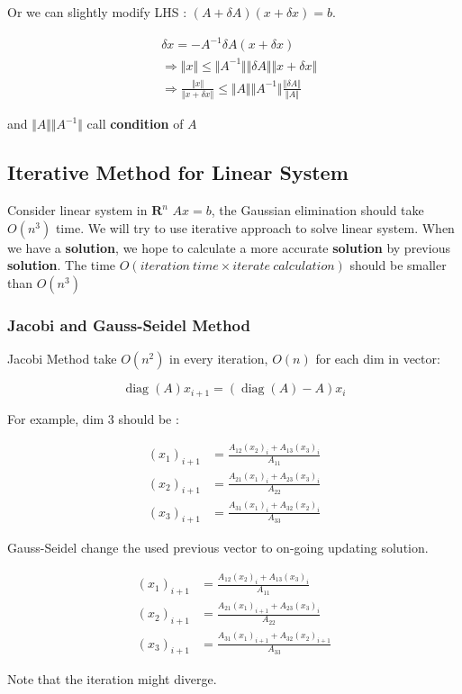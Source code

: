 Or we can slightly modify LHS :
$(A + \delta A)(x + \delta x) = b$.

\begin{align}
  &\delta x = -A^{-1}\delta A(x + \delta x) \nonumber \\
  &\Rightarrow \Vert x \Vert \leq
    \Vert A^{-1} \Vert \Vert \delta A \Vert \Vert x + \delta x \Vert \nonumber \\
  &\Rightarrow \frac{\Vert x \Vert}{\Vert x + \delta x \Vert} \leq
    \Vert A \Vert \Vert A^{-1} \Vert \frac{\Vert \delta A \Vert}{\Vert A \Vert} \nonumber
\end{align}

and $\Vert A \Vert \Vert A^{-1} \Vert$ call \textbf{condition} of $A$

\subsection{Iterative Method for Linear System}

Consider linear system in $\mathbf{R}^n$ $Ax = b$,
the Gaussian elimination should take $O(n^3)$ time. 
We will try to use iterative approach to solve linear system.
When we have a \textbf{solution},
we hope to calculate a more accurate \textbf{solution} by previous \textbf{solution}.
The time $O(iteration\ time \times iterate\ calculation)$ should be smaller than $O(n^3)$

\subsubsection{Jacobi and Gauss-Seidel Method}

Jacobi Method take $O(n^2)$ in every iteration, $O(n)$ for each dim in vector:

\newcommand{\diag}{\mathop{\mathrm{diag}}}

\[
  \diag(A)x_{i+1} = (\diag(A) - A)x_i
\]

For example, dim 3 should be :

\begin{align}
  (x_1)_{i+1} &= \frac{A_{12}(x_2)_i + A_{13}(x_3)_i}{A_{11}} \nonumber \\
  (x_2)_{i+1} &= \frac{A_{21}(x_1)_i + A_{23}(x_3)_i}{A_{22}} \nonumber \\
  (x_3)_{i+1} &= \frac{A_{31}(x_1)_i + A_{32}(x_2)_i}{A_{33}} \nonumber
\end{align}

Gauss-Seidel change the used previous vector to on-going updating solution.

\begin{align}
  (x_1)_{i+1} &= \frac{A_{12}(x_2)_i + A_{13}(x_3)_i}{A_{11}} \nonumber \\
  (x_2)_{i+1} &= \frac{A_{21}(x_1)_{i+1} + A_{23}(x_3)_i}{A_{22}} \nonumber \\
  (x_3)_{i+1} &= \frac{A_{31}(x_1)_{i+1} + A_{32}(x_2)_{i+1}}{A_{33}} \nonumber
\end{align}

Note that the iteration might diverge.
